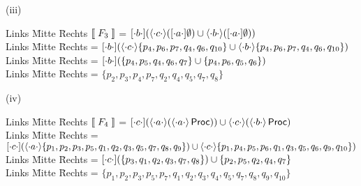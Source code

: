   (iii)
\begin{tabbing}
    Links \= Mitte \= Rechts \kill
$\left \llbracket \; F_3 \; \right \rrbracket$ \> = \> 
$[ \cdot b \cdot ]  (\langle \cdot c \cdot \rangle ([ \cdot a \cdot ]  \emptyset) \cup \langle \cdot b \cdot \rangle([ \cdot a \cdot ]  \emptyset))$
\\
Links \= Mitte \= Rechts \kill
\> = \> $[ \cdot b \cdot ]  (\langle \cdot c \cdot \rangle \lbrace p_4,p_6,p_7,q_4,q_6,q_{10} \rbrace \cup 
\langle \cdot b \cdot \rangle \lbrace p_4,p_6,p_7,q_4,q_6,q_{10} \rbrace)$ \\
Links \= Mitte \= Rechts \kill
\> = \> $[ \cdot b \cdot ]  (\lbrace p_4,p_5,q_4,q_6,q_{7} \rbrace \cup 
\lbrace p_4,p_6,q_5,q_6 \rbrace)$ \\
Links \= Mitte \= Rechts \kill
\> = \> $\lbrace p_2,p_3,p_4,p_7,q_2,q_4,q_5,q_7,q_8 \rbrace$\\
  \end{tabbing}
  (iv)
\begin{tabbing}
    Links \= Mitte \= Rechts \kill
$\left \llbracket \; F_4 \; \right \rrbracket$ \> = \> 
$[ \cdot c \cdot ]  (\langle \cdot a \cdot \rangle (\langle \cdot a \cdot \rangle \operatorname{\sf Proc})) \cup \langle \cdot c \cdot \rangle(\langle \cdot b \cdot \rangle \operatorname{\sf Proc})$
\\
Links \= Mitte \= Rechts \kill
\> = \> $[ \cdot c \cdot ]  (\langle \cdot a \cdot \rangle \lbrace p_1,p_2,p_3,p_5,q_1,q_2,q_3,q_5,q_7,q_8,q_9 \rbrace) \cup 
\langle \cdot c \cdot \rangle \lbrace p_1,p_4,p_5,p_6,q_1,q_3,q_5,q_6,q_9,q_{10} \rbrace)$ \\
Links \= Mitte \= Rechts \kill
\> = \> $[ \cdot c \cdot ]  (\lbrace p_3,q_1,q_2,q_3,q_{7},q_8 \rbrace) \cup 
\lbrace p_2,p_5,q_2,q_4,q_7 \rbrace$ \\
Links \= Mitte \= Rechts \kill
\> = \> $\lbrace p_1,p_2,p_3,p_5,p_7,q_1,q_2,q_3,q_4,q_5,q_7,q_8,q_9,q_{10} \rbrace$\\
\\ \\ \\ \\ \\ \\ \end{tabbing}

